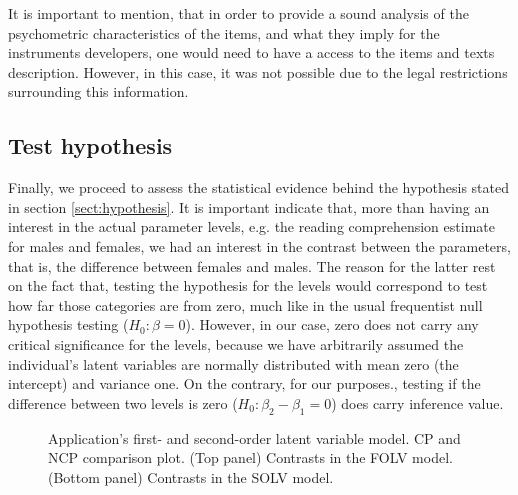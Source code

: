 It is important to mention, that in order to provide a sound analysis of the psychometric characteristics of the items, and what they imply for the instruments developers, one would need to have a access to the items and texts description. However, in this case, it was not possible due to the legal restrictions surrounding this information.


\subsection{Test hypothesis} \label{sect:test_hypothesis}

Finally, we proceed to assess the statistical evidence behind the hypothesis stated in section \ref{sect:hypothesis}. It is important indicate that, more than having an interest in the actual parameter levels, e.g. the reading comprehension estimate for males and females, we had an interest in the contrast between the parameters, that is, the difference between females and males. The reason for the latter rest on the fact that, testing the hypothesis for the levels would correspond to test how far those categories are from zero, much like in the usual frequentist null hypothesis testing ($H_{0}: \beta=0$). However, in our case, zero does not carry any critical significance for the levels, because we have arbitrarily assumed the individual's latent variables are normally distributed with mean zero (the intercept) and variance one. On the contrary, for our purposes., testing if the difference between two levels is zero ($H_{0}: \beta_{2} - \beta_{1}=0$) does carry inference value.
%
\begin{figure}[H]
	\centering
	\begin{subfigure}
		\texttt{[image: FOLV\_recovery\_contrast]}
	\end{subfigure}
	\begin{subfigure}
		\texttt{[image: SOLV\_recovery\_contrast]}
	\end{subfigure}
	\caption[Application's first- and second-order latent variable model. CP and NCP comparison plot.]%
	{Application's first- and second-order latent variable model. CP and NCP comparison plot. (Top panel) Contrasts in the FOLV model. (Bottom panel) Contrasts in the SOLV model. }
	\label{fig:contrast_both}
\end{figure}

